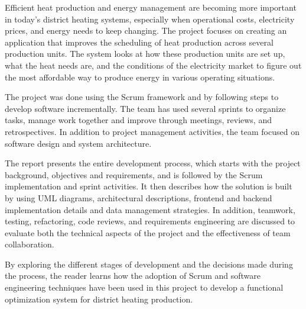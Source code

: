 
\noindent
Efficient heat production and energy management are becoming more important in today's district heating systems, especially when operational costs, electricity prices, and energy needs to keep changing. The project focuses on creating an application that improves the scheduling of heat production across several production units. The system looks at how these production units are set up, what the heat needs are, and the conditions of the electricity market to figure out the most affordable way to produce energy in various operating situations.
\par
The project was done using the Scrum framework and by following steps to develop software incrementally. The team has used several sprints to organize tasks, manage work together and improve through meetings, reviews, and retrospectives. In addition to project management activities, the team focused on software design and system architecture. 
\par  
The report presents the entire development process, which starts with the project background, objectives and requirements, and is followed by the Scrum implementation and sprint activities. It then describes how the solution is built by using UML diagrams, architectural descriptions, frontend and backend implementation details and data management strategies. In addition, teamwork, testing, refactoring, code reviews, and requirements engineering are discussed to evaluate both the technical aspects of the project and the effectiveness of team collaboration. 
\par
By exploring the different stages of development and the decisions made during the process, the reader learns how the adoption of Scrum and software engineering techniques have been used in this project to develop a functional optimization system for district heating production. 
